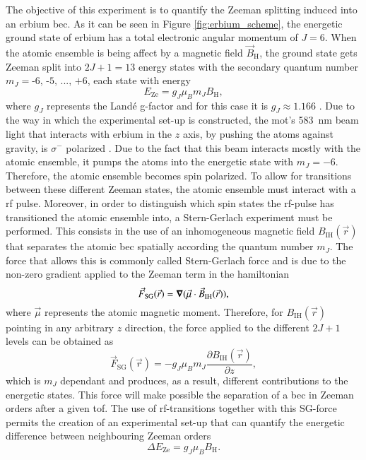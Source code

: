 The objective of this experiment is to quantify the Zeeman splitting induced into an erbium \ac{bec}. As it can be seen in Figure \ref{fig:erbium_scheme}, the energetic ground state of erbium has a total electronic angular momentum of $J = 6$. When the atomic ensemble is being affect by a magnetic field $\vec{B}_\text{H}$, the ground state gets Zeeman split into $2J+1 = 13$ energy states with the secondary quantum number $m_J = \text{-6, -5, ..., +6}$, each state with energy
\begin{equation}
	E_\text{Ze} = g_J \mu_B m_J B_\text{H},
\end{equation}
where $g_J$ represents the Landé g-factor and for this case it is $g_J\approx1.166$ \cite{Foot2005}. Due to the way in which the experimental set-up is constructed, the \ac{mot}'s \SI{583}{\nano\meter} beam light that interacts with erbium in the $z$ axis, by pushing the atoms against gravity, is $\sigma^-$ polarized \cite{Ulitzsch2016}. Due to the fact that this beam interacts mostly with the atomic ensemble, it pumps the atoms into the energetic state with $m_J = -6$. Therefore, the atomic ensemble becomes spin polarized. To allow for transitions between these different Zeeman states, the atomic ensemble must interact with a \acf{rf} pulse. Moreover, in order to distinguish which spin states the \ac{rf}-pulse has transitioned the atomic ensemble into, a Stern-Gerlach experiment must be performed. This consists in the use of an inhomogeneous magnetic field $B_\text{IH}(\vec{r})$ that separates the atomic \ac{bec} spatially according the quantum number $m_J$. The force that allows this is commonly called Stern-Gerlach force and is due to the non-zero gradient applied to the Zeeman term in the hamiltonian \cite{Foot2005}
\begin{equation}
	\vec{F}_\text{SG}(\vec{r}) = \grad{(\vec{\mu}\cdot\vec{B}_\text{IH}(\vec{r}))},
\end{equation}
where $\vec{\mu}$ represents the atomic magnetic moment. Therefore, for $B_\text{IH}(\vec{r})$ pointing in any arbitrary $z$ direction, the force applied to the different $2J+1$ levels can be obtained as
\begin{equation}\label{eq:Stern-Gerlach_force}
	\vec{F}_\text{SG}(\vec{r}) = - g_J \mu_B m_J \frac{\partial B_\text{IH}(\vec{r})}{\partial z},
\end{equation}
which is $m_J$ dependant and produces, as a result, different contributions to the energetic states. This force will make possible the separation of a \ac{bec} in Zeeman orders after a given \ac{tof}. The use of \ac{rf}-transitions together with this SG-force permits the creation of an experimental set-up that can quantify the energetic difference between neighbouring Zeeman orders
\begin{equation}\label{eq:Zeeman_splitting_difference}
\Delta E_\text{Ze} = g_J \mu_B B_\text{H}.
\end{equation}

